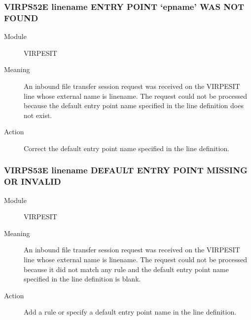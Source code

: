 \documentclass[letterpaper,10pt,english]{sphinxmanual}
\begin{document}
\subsubsection{VIRPS52E linename ENTRY POINT ‘epname’ WAS NOT FOUND}
\label{\detokenize{messages:virps52e-linename-entry-point-epname-was-not-found}}\begin{description}
\item[{Module}] \leavevmode
VIRPESIT

\item[{Meaning}] \leavevmode
An inbound file transfer session request was received on the VIRPESIT line whose external name is linename. The request could not be processed because the default entry point name specified in the line definition does not exist.

\item[{Action}] \leavevmode
Correct the default entry point name specified in the line definition.

\end{description}


\subsubsection{VIRPS53E linename DEFAULT ENTRY POINT MISSING OR INVALID}
\label{\detokenize{messages:virps53e-linename-default-entry-point-missing-or-invalid}}\begin{description}
\item[{Module}] \leavevmode
VIRPESIT

\item[{Meaning}] \leavevmode
An inbound file transfer session request was received on the VIRPESIT line whose external name is linename. The request could not be processed because it did not match any rule and the default entry point name specified in the line definition is blank.

\item[{Action}] \leavevmode
Add a rule or specify a default entry point name in the line definition.

\end{description}
\end{document}
